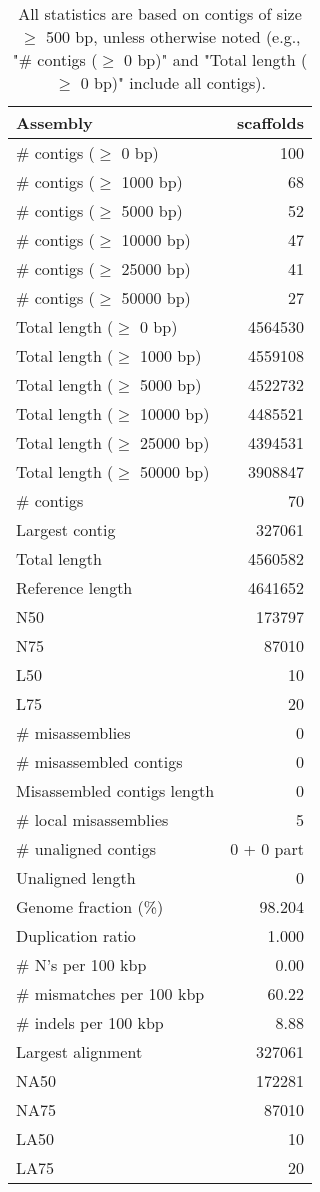 \documentclass[12pt,a4paper]{article}
\begin{document}
\begin{table}[ht]
\begin{center}
\caption{All statistics are based on contigs of size $\geq$ 500 bp, unless otherwise noted (e.g., "\# contigs ($\geq$ 0 bp)" and "Total length ($\geq$ 0 bp)" include all contigs).}
\begin{tabular}{|l*{1}{|r}|}
\hline
Assembly & scaffolds \\ \hline
\# contigs ($\geq$ 0 bp) & 100 \\ \hline
\# contigs ($\geq$ 1000 bp) & 68 \\ \hline
\# contigs ($\geq$ 5000 bp) & 52 \\ \hline
\# contigs ($\geq$ 10000 bp) & 47 \\ \hline
\# contigs ($\geq$ 25000 bp) & 41 \\ \hline
\# contigs ($\geq$ 50000 bp) & 27 \\ \hline
Total length ($\geq$ 0 bp) & 4564530 \\ \hline
Total length ($\geq$ 1000 bp) & 4559108 \\ \hline
Total length ($\geq$ 5000 bp) & 4522732 \\ \hline
Total length ($\geq$ 10000 bp) & 4485521 \\ \hline
Total length ($\geq$ 25000 bp) & 4394531 \\ \hline
Total length ($\geq$ 50000 bp) & 3908847 \\ \hline
\# contigs & 70 \\ \hline
Largest contig & 327061 \\ \hline
Total length & 4560582 \\ \hline
Reference length & 4641652 \\ \hline
N50 & 173797 \\ \hline
N75 & 87010 \\ \hline
L50 & 10 \\ \hline
L75 & 20 \\ \hline
\# misassemblies & 0 \\ \hline
\# misassembled contigs & 0 \\ \hline
Misassembled contigs length & 0 \\ \hline
\# local misassemblies & 5 \\ \hline
\# unaligned contigs & 0 + 0 part \\ \hline
Unaligned length & 0 \\ \hline
Genome fraction (\%) & 98.204 \\ \hline
Duplication ratio & 1.000 \\ \hline
\# N's per 100 kbp & 0.00 \\ \hline
\# mismatches per 100 kbp & 60.22 \\ \hline
\# indels per 100 kbp & 8.88 \\ \hline
Largest alignment & 327061 \\ \hline
NA50 & 172281 \\ \hline
NA75 & 87010 \\ \hline
LA50 & 10 \\ \hline
LA75 & 20 \\ \hline
\end{tabular}
\end{center}
\end{table}
\end{document}
